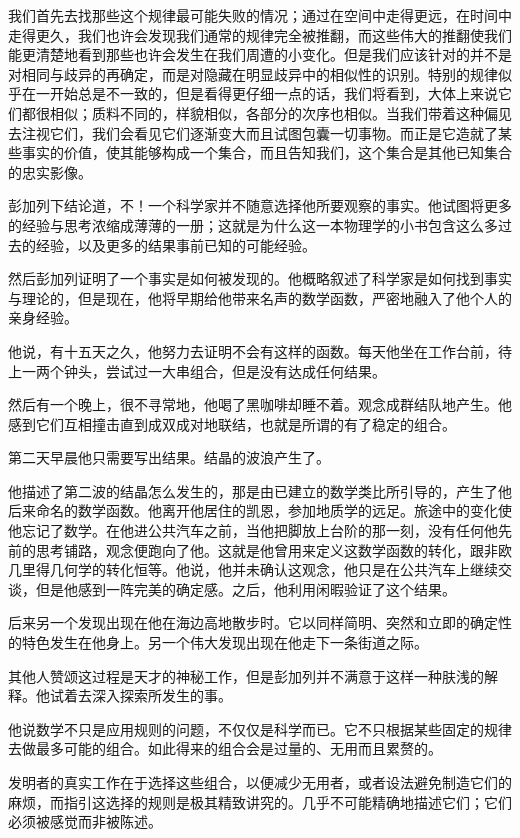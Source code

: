 \documentclass[UTF8]{article}
\begin{document}
\par 我们首先去找那些这个规律最可能失败的情况；通过在空间中走得更远，在时间中走得更久，我们也许会发现我们通常的规律完全被推翻，而这些伟大的推翻使我们能更清楚地看到那些也许会发生在我们周遭的小变化。但是我们应该针对的并不是对相同与歧异的再确定，而是对隐藏在明显歧异中的相似性的识别。特别的规律似乎在一开始总是不一致的，但是看得更仔细一点的话，我们将看到，大体上来说它们都很相似；质料不同的，样貌相似，各部分的次序也相似。当我们带着这种偏见去注视它们，我们会看见它们逐渐变大而且试图包囊一切事物。而正是它造就了某些事实的价值，使其能够构成一个集合，而且告知我们，这个集合是其他已知集合的忠实影像。
\par 彭加列下结论道，不！一个科学家并不随意选择他所要观察的事实。他试图将更多的经验与思考浓缩成薄薄的一册；这就是为什么这一本物理学的小书包含这么多过去的经验，以及更多的结果事前已知的可能经验。
\par 然后彭加列证明了一个事实是如何被发现的。他概略叙述了科学家是如何找到事实与理论的，但是现在，他将早期给他带来名声的数学函数，严密地融入了他个人的亲身经验。
\par 他说，有十五天之久，他努力去证明不会有这样的函数。每天他坐在工作台前，待上一两个钟头，尝试过一大串组合，但是没有达成任何结果。
\par 然后有一个晚上，很不寻常地，他喝了黑咖啡却睡不着。观念成群结队地产生。他感到它们互相撞击直到成双成对地联结，也就是所谓的有了稳定的组合。
\par 第二天早晨他只需要写出结果。结晶的波浪产生了。
\par 他描述了第二波的结晶怎么发生的，那是由已建立的数学类比所引导的，产生了他后来命名的数学函数。他离开他居住的凯恩，参加地质学的远足。旅途中的变化使他忘记了数学。在他进公共汽车之前，当他把脚放上台阶的那一刻，没有任何他先前的思考铺路，观念便跑向了他。这就是他曾用来定义这数学函数的转化，跟非欧几里得几何学的转化恒等。他说，他并未确认这观念，他只是在公共汽车上继续交谈，但是他感到一阵完美的确定感。之后，他利用闲暇验证了这个结果。
\par 后来另一个发现出现在他在海边高地散步时。它以同样简明、突然和立即的确定性的特色发生在他身上。另一个伟大发现出现在他走下一条街道之际。
\par 其他人赞颂这过程是天才的神秘工作，但是彭加列并不满意于这样一种肤浅的解释。他试着去深入探索所发生的事。
\par 他说数学不只是应用规则的问题，不仅仅是科学而已。它不只根据某些固定的规律去做最多可能的组合。如此得来的组合会是过量的、无用而且累赘的。
\par 发明者的真实工作在于选择这些组合，以便减少无用者，或者设法避免制造它们的麻烦，而指引这选择的规则是极其精致讲究的。几乎不可能精确地描述它们；它们必须被感觉而非被陈述。
\end{document}
